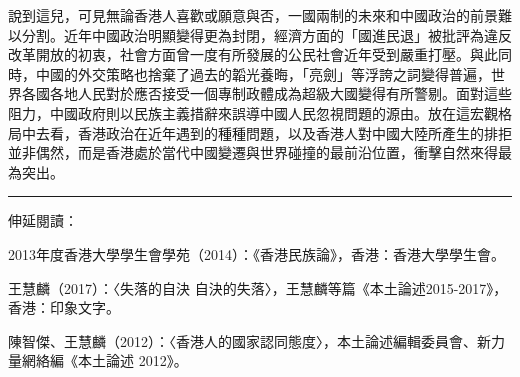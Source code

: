 說到這兒，可見無論香港人喜歡或願意與否，一國兩制的未來和中國政治的前景難以分割。近年中國政治明顯變得更為封閉，經濟方面的「國進民退」被批評為違反改革開放的初衷，社會方面曾一度有所發展的公民社會近年受到嚴重打壓。與此同時，中國的外交策略也捨棄了過去的韜光養晦，「亮劍」等浮誇之詞變得普遍，世界各國各地人民對於應否接受一個專制政體成為超級大國變得有所警剔。面對這些阻力，中國政府則以民族主義措辭來誤導中國人民忽視問題的源由。放在這宏觀格局中去看，香港政治在近年遇到的種種問題，以及香港人對中國大陸所產生的排拒並非偶然，而是香港處於當代中國變遷與世界碰撞的最前沿位置，衝擊自然來得最為突出。

\rule[-10pt]{15cm}{0.05em}

伸延閱讀：

2013年度香港大學學生會學苑（2014）：《香港民族論》，香港：香港大學學生會。

王慧麟（2017）：〈失落的自決 自決的失落〉，王慧麟等篇《本土論述2015-2017》，香港：印象文字。

陳智傑、王慧麟（2012）：〈香港人的國家認同態度〉，本土論述編輯委員會、新力量網絡編《本土論述 2012》。